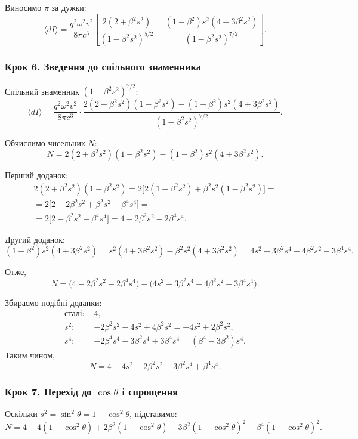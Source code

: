 \documentclass[a4paper,12pt]{article}
\begin{document}
Виносимо $\pi$ за дужки:
\[
\langle dI \rangle = \frac{q^2\omega^2 v^2}{8\pi c^3}\left[
\frac{2(2+\beta^2 s^2)}{(1-\beta^2 s^2)^{5/2}}
- \frac{(1-\beta^2)s^2(4+3\beta^2 s^2)}{(1-\beta^2 s^2)^{7/2}}
\right].
\]

\subsubsection{Крок 6. Зведення до спільного знаменника}
Спільний знаменник $(1-\beta^2 s^2)^{7/2}$:
\[
\langle dI \rangle = \frac{q^2\omega^2 v^2}{8\pi c^3}\cdot
\frac{ 2(2+\beta^2 s^2)(1-\beta^2 s^2) - (1-\beta^2)s^2(4+3\beta^2 s^2) }
{(1-\beta^2 s^2)^{7/2}}.
\]

Обчислимо чисельник $N$:
\[
N = 2(2+\beta^2 s^2)(1-\beta^2 s^2) - (1-\beta^2)s^2(4+3\beta^2 s^2).
\]

Перший доданок:
\begin{multline*}
2(2+\beta^2 s^2)(1-\beta^2 s^2) = 2\bigl[2(1-\beta^2 s^2) + \beta^2 s^2(1-\beta^2 s^2)\bigr] = \\
= 2\bigl[2 - 2\beta^2 s^2 + \beta^2 s^2 - \beta^4 s^4\bigr] = \\
= 2\bigl[2 - \beta^2 s^2 - \beta^4 s^4\bigr] = 4 - 2\beta^2 s^2 - 2\beta^4 s^4.
\end{multline*}

Другий доданок:
\[
(1-\beta^2)s^2(4+3\beta^2 s^2) = s^2(4+3\beta^2 s^2) - \beta^2 s^2(4+3\beta^2 s^2)
= 4s^2 + 3\beta^2 s^4 - 4\beta^2 s^2 - 3\beta^4 s^4.
\]

Отже,
\[
N = \bigl(4 - 2\beta^2 s^2 - 2\beta^4 s^4\bigr) - \bigl(4s^2 + 3\beta^2 s^4 - 4\beta^2 s^2 - 3\beta^4 s^4\bigr).
\]

Збираємо подібні доданки:
\begin{align*}
\text{сталі: } & 4,\\
s^2: & -2\beta^2 s^2 - 4s^2 + 4\beta^2 s^2 = -4s^2 + 2\beta^2 s^2,\\
s^4: & -2\beta^4 s^4 - 3\beta^2 s^4 + 3\beta^4 s^4 = (\beta^4 - 3\beta^2) s^4.
\end{align*}
Таким чином,
\[
N = 4 - 4s^2 + 2\beta^2 s^2 - 3\beta^2 s^4 + \beta^4 s^4.
\]

\subsubsection{Крок 7. Перехід до $\cos\theta$ і спрощення}
Оскільки $s^2 = \sin^2\theta = 1 - \cos^2\theta$, підставимо:
\[
N = 4 - 4(1-\cos^2\theta) + 2\beta^2(1-\cos^2\theta) - 3\beta^2(1-\cos^2\theta)^2 + \beta^4(1-\cos^2\theta)^2.
\]
\end{document}
